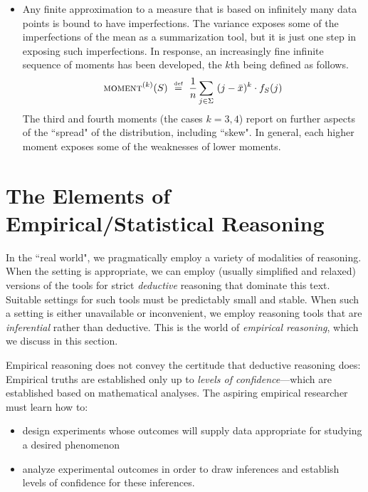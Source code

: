 \begin{itemize}
\medskip\item
Any finite approximation to a measure that is based on infinitely many data points is bound to have imperfections.  The variance exposes some of the imperfections of the mean as a summarization tool, but it is just one step in exposing such imperfections.  In response, an increasingly fine infinite sequence of moments has been developed, the $k$th being defined as follows.
\[
\mbox{\sc moment}^{(k)}(S) \ \stackrel{\mbox{{\tiny def}}}{=} \ {1 \over n} \sum_{j \in \Sigma} \ (j - \bar{x})^k \cdot f_S(j)
\]
The third and fourth moments (the cases $k = 3,4$) report on further aspects of the ``spread" of the distribution, including ``skew".  In general, each higher moment exposes some of the weaknesses of lower moments.
\end{itemize}


\section{The Elements of Empirical/Statistical Reasoning}
\label{sec:empirical}

In the ``real world", we pragmatically employ a variety of modalities of reasoning.  When the setting is appropriate, we can employ (usually simplified and relaxed) versions of the tools for strict {\em deductive} reasoning that dominate this text.  Suitable settings for such tools must be predictably small and stable.  When such a setting is either unavailable or inconvenient, we employ reasoning tools that are {\em inferential} rather than deductive.  This is the world of {\em empirical reasoning}, which we discuss in this section.

\medskip

Empirical reasoning does not convey the certitude that deductive reasoning does:  Empirical truths are established only up to {\em levels of confidence}---which are established based on mathematical analyses.  The aspiring empirical researcher must learn how to:
\begin{itemize}
\item
design experiments whose outcomes will supply data appropriate for studying a desired phenomenon
\medskip\item
analyze experimental outcomes in order to draw inferences and establish levels of confidence for these inferences.
\end{itemize}

\smallskip


